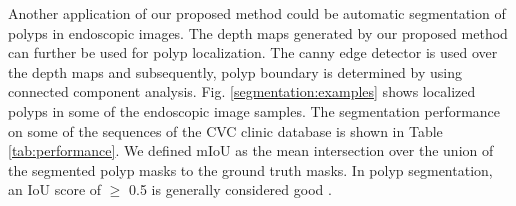 \documentclass[journal]{IEEEtran}
\begin{document}
Another application of our proposed method could be     
automatic segmentation of polyps in endoscopic images. The depth maps generated by our proposed method can further be used for polyp localization. The canny edge detector is used over the depth maps and subsequently, polyp boundary is determined by using connected component analysis. Fig. \ref{segmentation:examples} shows localized polyps in some of the endoscopic image samples. The segmentation performance on some of the sequences of the CVC clinic database is shown in Table \ref{tab:performance}.
 We defined mIoU as the mean intersection over the union of the segmented polyp masks to the ground truth masks. In polyp segmentation, an IoU score of $\geq$ 0.5 is generally considered good \cite{yamada2019development}. 
\end{document}
